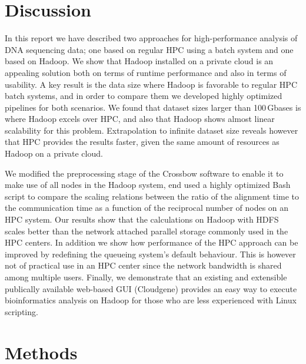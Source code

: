 \documentclass[10pt]{article}
\begin{document}
\section*{Discussion}

In this report we have described two approaches for high-performance analysis of DNA sequencing data; one based on regular HPC using a batch system and one based on Hadoop. We show that Hadoop installed on a private cloud is an appealing solution both on terms of runtime performance and also in terms of usability. A key result is the data size where Hadoop is favorable to regular HPC batch systems, and in order to compare them we developed highly optimized pipelines for both scenarios. We found that dataset sizes larger than 100\,Gbases is where Hadoop excels over HPC, and also that Hadoop shows almost linear scalability for this problem. Extrapolation to infinite dataset size reveals however that HPC provides the results faster, given the same amount of resources as Hadoop on a private cloud.

We modified the preprocessing stage of the Crossbow software to enable it to make use of all nodes in the Hadoop system, end used a highly optimized Bash script to compare the scaling relations between the ratio of the alignment time to the communication time as a function of the reciprocal number of nodes on an HPC system. 
Our results show that the calculations on Hadoop with HDFS scales better than the network attached parallel storage commonly used in the HPC centers.
In addition we show how performance of the HPC approach can be improved by redefining the queueing system's default behaviour. This is however not of practical use in an HPC center since the network bandwidth is shared among multiple users. Finally, we demonstrate that an existing and extensible publically available web-based GUI (Cloudgene) provides an easy way to execute bioinformatics analysis on Hadoop for those who are less experienced with Linux scripting.









\section*{Methods}
\end{document}
